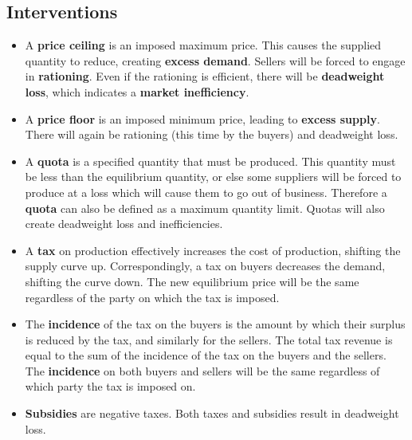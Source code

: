 \documentclass[a4paper]{article}
\begin{document}
\subsection{Interventions}
\begin{itemize}
    \item A \textbf{price ceiling} is an imposed maximum price. This causes the supplied quantity to reduce, creating \textbf{excess demand}. Sellers will be forced to engage in \textbf{rationing}. Even if the rationing is efficient, there will be \textbf{deadweight loss}, which indicates a \textbf{market inefficiency}. 
    \item A \textbf{price floor} is an imposed minimum price, leading to \textbf{excess supply}. There will again be rationing (this time by the buyers) and deadweight loss.
    \item A \textbf{quota} is a specified quantity that must be produced. This quantity must be less than the equilibrium quantity, or else some suppliers will be forced to produce at a loss which will cause them to go out of business. Therefore a \textbf{quota} can also be defined as a maximum quantity limit. Quotas will also create deadweight loss and inefficiencies.
    \item A \textbf{tax} on production effectively increases the cost of production, shifting the supply curve up. Correspondingly, a tax on buyers decreases the demand, shifting the curve down. The new equilibrium price will be the same regardless of the party on which the tax is imposed.
    \item The \textbf{incidence} of the tax on the buyers is the amount by which their surplus is reduced by the tax, and similarly for the sellers. The total tax revenue is equal to the sum of the incidence of the tax on the buyers and the sellers. The \textbf{incidence} on both buyers and sellers will be the same regardless of which party the tax is imposed on.
    \item \textbf{Subsidies} are negative taxes. Both taxes and subsidies result in deadweight loss.
\end{itemize}
\end{document}
